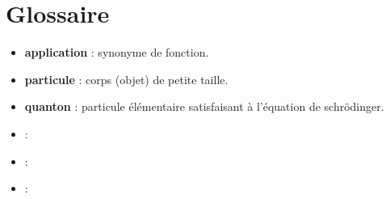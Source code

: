 
\chapter{Glossaire}

\begin{itemize}[leftmargin=1cm, label=, itemsep=2pt]
\item {\bf application} : synonyme de fonction.
\item {\bf particule} : corps (objet) de petite taille.
\item {\bf quanton} : particule élémentaire satisfaisant à l'équation de schrödinger.
\item {\bf } :
\item {\bf } :
\item {\bf } :
\end{itemize}



